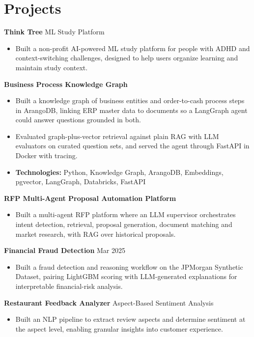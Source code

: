 \documentclass[10pt,a4paper]{article}
\begin{document}
\section{Projects}
\textbf{Think Tree} \textbar{} ML Study Platform\par
\begin{itemize}
  \item Built a non-profit AI-powered ML study platform for people with ADHD and context-switching challenges, designed to help users organize learning and maintain study context.
\end{itemize}
\textbf{Business Process Knowledge Graph}\par
\begin{itemize}
  \item Built a knowledge graph of business entities and order-to-cash process steps in ArangoDB, linking ERP master data to documents so a LangGraph agent could answer questions grounded in both.
  \item Evaluated graph-plus-vector retrieval against plain RAG with LLM evaluators on curated question sets, and served the agent through FastAPI in Docker with tracing.
  \item \textbf{Technologies:} Python, Knowledge Graph, ArangoDB, Embeddings, pgvector, LangGraph, Databricks, FastAPI
\end{itemize}
\textbf{RFP Multi-Agent Proposal Automation Platform}\par
\begin{itemize}
  \item Built a multi-agent RFP platform where an LLM supervisor orchestrates intent detection, retrieval, proposal generation, document matching and market research, with RAG over historical proposals.
\end{itemize}
\textbf{Financial Fraud Detection} \textbar{} Mar 2025\par
\begin{itemize}
  \item Built a fraud detection and reasoning workflow on the JPMorgan Synthetic Dataset, pairing LightGBM scoring with LLM-generated explanations for interpretable financial-risk analysis.
\end{itemize}
\textbf{Restaurant Feedback Analyzer} \textbar{} Aspect-Based Sentiment Analysis\par
\begin{itemize}
  \item Built an NLP pipeline to extract review aspects and determine sentiment at the aspect level, enabling granular insights into customer experience.
\end{itemize}
\end{document}
